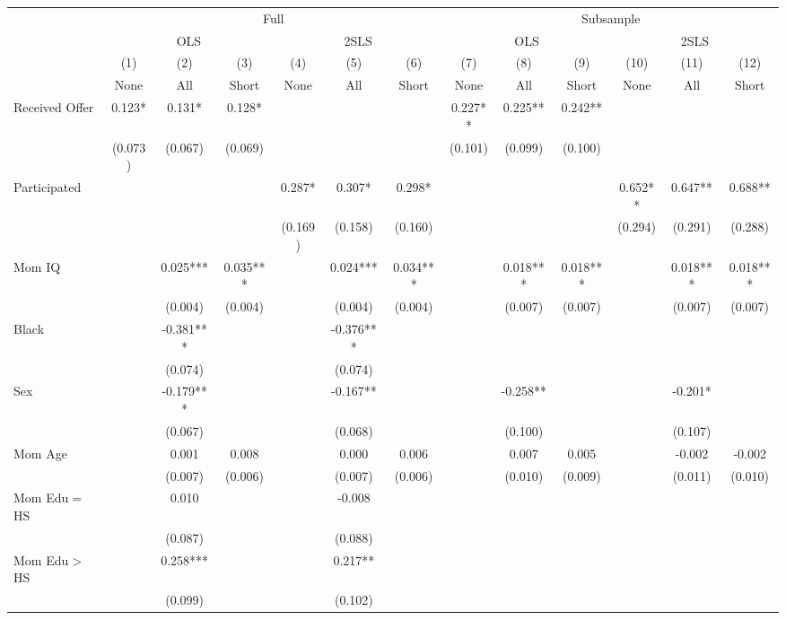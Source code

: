 \begin{tabular}{lcccccccccccc}
\toprule 
\midrule 
 & \multicolumn{6}{c}{Full} & \multicolumn{6}{c}{Subsample} \\
 \cmidrule(lr){2-7} \cmidrule(lr){8-13} 
 & \multicolumn{3}{c}{OLS} & \multicolumn{3}{c}{2SLS} & \multicolumn{3}{c}{OLS} & \multicolumn{3}{c}{2SLS} \\
 \cmidrule(lr){2-4} \cmidrule(lr){5-7} \cmidrule(lr){8-10} \cmidrule(lr){11-13} 
 & (1) & (2) & (3) & (4) & (5) & (6) & (7) & (8) & (9) & (10) & (11) & (12) \\
 & None & All & Short & None & All & Short & None & All & Short & None & All & Short \\
\midrule 
Received Offer & 0.123* & 0.131* & 0.128* &  &  &  & 0.227** & 0.225** & 0.242** &  &  &  \\
 & (0.073) & (0.067) & (0.069) &  &  &  & (0.101) & (0.099) & (0.100) &  &  &  \\
Participated &  &  &  & 0.287* & 0.307* & 0.298* &  &  &  & 0.652** & 0.647** & 0.688** \\
 &  &  &  & (0.169) & (0.158) & (0.160) &  &  &  & (0.294) & (0.291) & (0.288) \\
Mom IQ &  & 0.025*** & 0.035*** &  & 0.024*** & 0.034*** &  & 0.018*** & 0.018*** &  & 0.018*** & 0.018*** \\
 &  & (0.004) & (0.004) &  & (0.004) & (0.004) &  & (0.007) & (0.007) &  & (0.007) & (0.007) \\
Black &  & -0.381*** &  &  & -0.376*** &  &  &  &  &  &  &  \\
 &  & (0.074) &  &  & (0.074) &  &  &  &  &  &  &  \\
Sex &  & -0.179*** &  &  & -0.167** &  &  & -0.258** &  &  & -0.201* &  \\
 &  & (0.067) &  &  & (0.068) &  &  & (0.100) &  &  & (0.107) &  \\
Mom Age &  & 0.001 & 0.008 &  & 0.000 & 0.006 &  & 0.007 & 0.005 &  & -0.002 & -0.002 \\
 &  & (0.007) & (0.006) &  & (0.007) & (0.006) &  & (0.010) & (0.009) &  & (0.011) & (0.010) \\
Mom Edu$=$HS &  & 0.010 &  &  & -0.008 &  &  &  &  &  &  &  \\
 &  & (0.087) &  &  & (0.088) &  &  &  &  &  &  &  \\
Mom Edu$>$HS &  & 0.258*** &  &  & 0.217** &  &  &  &  &  &  &  \\
 &  & (0.099) &  &  & (0.102) &  &  &  &  &  &  &  \\

\end{tabular}
